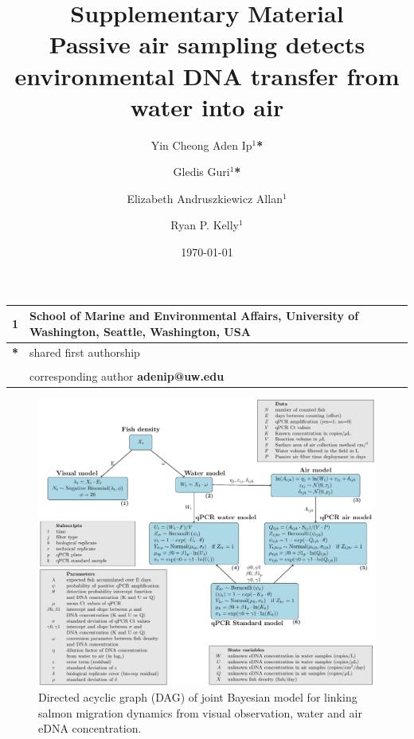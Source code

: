 \documentclass{article}
\title{Supplementary Material \\ \large{Passive air sampling detects environmental DNA transfer from water into air}}
\author{Yin Cheong Aden Ip$^1$\textbf{*} \and
Gledis Guri$^1$\textbf{*} \and
Elizabeth Andruszkiewicz Allan$^1$ \and
Ryan P. Kelly$^1$}
\date{\today}
\begin{document}
\maketitle


\begin{center}
\begin{tabular}{ll}
1 & School of Marine and Environmental Affairs, University of Washington, Seattle, Washington, USA \\
\hline
\textbf{*} & shared first authorship\\
&\\
& corresponding author \textbf{adenip@uw.edu}
\end{tabular}
\end{center}


\clearpage
\begin{figure}[tbhp] 
\centering
\includegraphics[width=16.5cm]{../../Plots/Supplementary Figure 1.pdf}  
\caption{Directed acyclic graph (DAG) of joint Bayesian model for linking salmon migration dynamics from visual observation, water and air eDNA concentration.}
\label{fig:DAG}
\end{figure}

\end{document}
